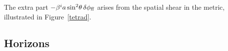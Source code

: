 \documentclass[twocolumn,showpacs,preprintnumbers,amsmath,amssymb,prb]{revtex4}
\begin{document}
The extra part $- \beta^i a \sin^2\!\theta \, \delta \phi_{\rm ff}$
arises from the spatial shear in the metric,
illustrated in Figure~\ref{tetrad}.

\subsection{Horizons}
\label{horizons}
\end{document}
